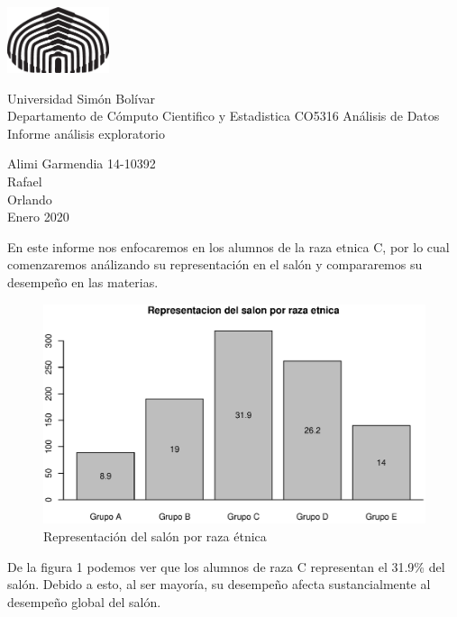 \documentclass{article}
\begin{document}
  \parbox{3.3cm}{\includegraphics[width=3cm]{usblogo.eps}}\parbox{8cm}{Universidad
   Sim\'on Bol\'ivar\\
   Departamento de C\'omputo Cientifico y Estadistica
   \hspace{1cm}CO5316 An\'alisis de Datos\\
   Informe an\'alisis exploratorio}\parbox{17cm}{ \hspace{1cm}Alimi Garmendia 14-10392\\
  \hspace*{1cm}Rafael \\
  \hspace*{1cm}Orlando \\
   \hspace*{1cm}Enero 2020}
   \vspace{1cm}

    En este informe nos enfocaremos en los alumnos de la raza etnica C, por lo cual comenzaremos an\'alizando
    su representaci\'on en el sal\'on y compararemos su desempe\~no en las materias.
    

    \begin{figure}[h]
        \includegraphics[scale = 0.8]{Output/Plots/RepresentacionPorRaza.eps}
        \caption{Representaci\'on del sal\'on por raza \'etnica}
        \label{fig:minipage1}
    \end{figure}


De la figura 1 podemos ver que los alumnos de raza C representan el 31.9\% del sal\'on. Debido a esto, al ser mayor\'ia,
su desempe\~no afecta sustancialmente al desempe\~no global del sal\'on.
\end{document}
